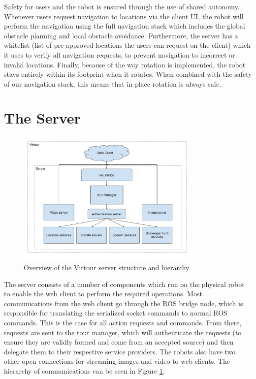 \documentclass[
  oneside,
  11pt, a4paper,
  footinclude=true,
  headinclude=true,
  cleardoublepage=empty
]{article}
\begin{document}
Safety for users and the robot is ensured through the use of shared autonomy.
Whenever users request navigation to locations via the client UI, the robot
will perform the navigation using the full navigation stack which includes the
global obstacle planning and local obstacle avoidance. Furthermore, the server
has a whitelist (list of pre-approved locations the users can request on the
client) which it uses to verify all navigation requests, to prevent navigation
to incorrect or invalid locations. Finally, because of the way rotation is
implemented, the robot stays entirely within its footprint when it rotates.
When combined with the safety of our navigation stack, this means that in-place
rotation is always safe.


\section{The Server}\label{sec:server}

\begin{figure}
  \centering
  \includegraphics[width=3.5in]{virtour_server}
  \caption{Overview of the Virtour server structure and hierarchy}
  \label{fig:server}
\end{figure}

The server consists of a number of components which run on the physical robot
to enable the web client to perform the required operations. Most communications
from the web client go through the ROS bridge node, which is responsible
for translating the serialized socket commands to normal ROS commands. This is
the case for all action requests and commands. From there, requests are
sent to the tour manager, which will authenticate the requests (to ensure they
are validly formed and come from an accepted source) and then delegate them to
their respective service providers. The robots also have two other open
connections for streaming images and video to web clients. The hierarchy of
communications can be seen in Figure \ref{fig:server}.
\end{document}
